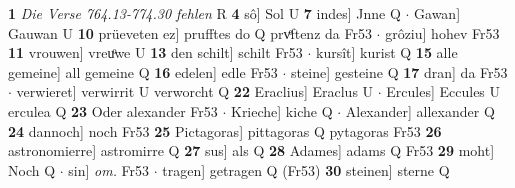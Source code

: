 \documentclass[8pt,a4paper,notitlepage]{article}
\begin{document}
\begin{table}[ht]
\begin{minipage}[t]{0.5\linewidth}
\textbf{1} \textit{Die Verse 764.13-774.30 fehlen} R  \textbf{4} sô] Sol U \textbf{7} indes] Jnne Q  $\cdot$ Gawan] Gauwan U \textbf{10} prüeveten ez] prufftes do Q prvͤftenz da Fr53  $\cdot$ grôziu] hohev Fr53 \textbf{11} vrouwen] vreuͦwe U \textbf{13} den schilt] schilt Fr53  $\cdot$ kursît] kurist Q \textbf{15} alle gemeine] all gemeine Q \textbf{16} edelen] edle Fr53  $\cdot$ steine] gesteine Q \textbf{17} dran] da Fr53  $\cdot$ verwieret] verwirrit U verworcht Q \textbf{22} Eraclius] Eraclus U  $\cdot$ Ercules] Eccules U erculea Q \textbf{23} Oder alexander Fr53  $\cdot$ Krieche] kiche Q  $\cdot$ Alexander] allexander Q \textbf{24} dannoch] noch Fr53 \textbf{25} Pictagoras] pittagoras Q pytagoras Fr53 \textbf{26} astronomierre] astromirre Q \textbf{27} sus] als Q \textbf{28} Adames] adams Q Fr53 \textbf{29} moht] Noch Q  $\cdot$ sin] \textit{om.} Fr53  $\cdot$ tragen] getragen Q (Fr53) \textbf{30} steinen] sterne Q \newline
\end{minipage}
\end{table}
\end{document}

